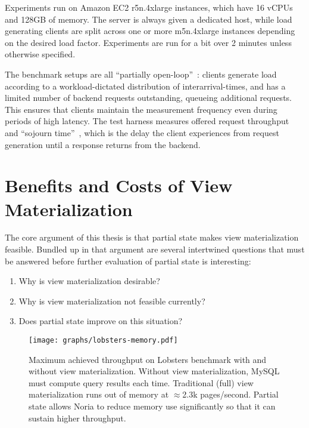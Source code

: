 Experiments run on Amazon EC2 r5n.4xlarge instances, which have 16 vCPUs and
128GB of memory. The server is always given a dedicated host, while load
generating clients are split across one or more m5n.4xlarge instances depending
on the desired load factor. Experiments are run for a bit over 2 minutes unless
otherwise specified.

The benchmark setups are all ``partially open-loop''~\cite{frank-open-loop}:
clients generate load according to a workload-dictated distribution of
interarrival-times, and has a limited number of backend requests outstanding,
queueing additional requests. This ensures that clients maintain the measurement
frequency even during periods of high latency. The test harness measures offered
request throughput and ``sojourn time''~\cite{open-loop-cautionary-tale}, which
is the delay the client experiences from request generation until a response
returns from the backend.


\section{Benefits and Costs of View Materialization}
\label{s:eval:why}

The core argument of this thesis is that partial state makes view
materialization feasible. Bundled up in that argument are several intertwined
questions that must be answered before further evaluation of partial state is
interesting:

\begin{enumerate}
    \item Why is view materialization desirable?
    \item Why is view materialization not feasible currently?
    \item Does partial state improve on this situation?
\end{enumerate}

\begin{figure}[h]
  \centering
  \texttt{[image: graphs/lobsters-memory.pdf]}
  \caption{Maximum achieved throughput on Lobsters benchmark with and without
  view materialization. Without view materialization, MySQL must compute query
  results each time. Traditional (full) view materialization runs out of memory
  at $\approx$2.3k pages/second. Partial state allows Noria to reduce memory use
  significantly so that it can sustain higher throughput.}
  \label{f:lobsters-memory}
\end{figure}

